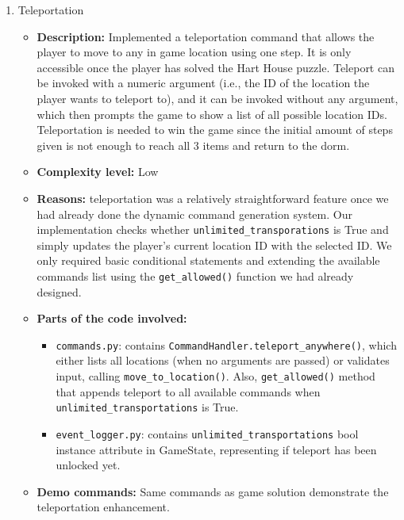 \documentclass[11pt]{article}
\begin{document}
\begin{enumerate}
\begin{itemize}
        \item \textbf{Demo commands:} Same commands as game solution demonstrate puzzle and code.
    \end{itemize}
    
    \item Teleportation
        \begin{itemize}
            \item \textbf{Description:} Implemented a teleportation command that allows the player to move to any in game location using one step. It is only accessible once the player has solved the Hart House puzzle. Teleport can be invoked with a numeric argument (i.e., the ID of the location the player wants to teleport to), and it can be invoked without any argument, which then prompts the game to show a list of all possible location IDs. Teleportation is needed to win the game since the initial amount of steps given is not enough to reach all 3 items and return to the dorm.

            \item \textbf{Complexity level:} Low
        
            \item \textbf{Reasons:} teleportation was a relatively straightforward  feature once we had already done the dynamic command generation system. Our implementation checks whether \verb|unlimited_transporations| is True and simply updates the player's current location ID with the selected ID. We only required basic conditional statements and extending the available commands list using the \verb|get_allowed()| function we had already designed.
        
            \item \textbf{Parts of the code involved:}
            \begin{itemize}
                \item \verb|commands.py|: contains \verb|CommandHandler.teleport_anywhere()|, which either lists all locations (when no arguments are passed) or validates input, calling \verb|move_to_location()|. Also, \verb|get_allowed()| method that appends teleport to all available commands when \\ \texttt{unlimited\_transportations} is True.
                \item \verb|event_logger.py|: contains \verb|unlimited_transportations| bool instance attribute in GameState, representing if teleport has been unlocked yet.
            \end{itemize}
        
            \item \textbf{Demo commands:} Same commands as game solution demonstrate the teleportation enhancement.
        \end{itemize}
\end{enumerate}
\end{document}
